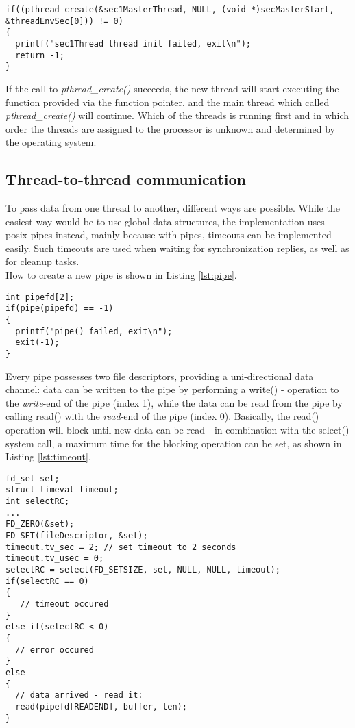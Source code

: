 \begin{lstlisting}[style=cStyle,caption={Creating a new thread},label=lst:pthread_create]
if((pthread_create(&sec1MasterThread, NULL, (void *)secMasterStart, &threadEnvSec[0])) != 0)
{
  printf("sec1Thread thread init failed, exit\n");
  return -1;
}
\end{lstlisting}
If the call to \textit{pthread\_create()} succeeds, the new thread will start executing the function provided via the function pointer, and the main thread which called 
\textit{pthread\_create()} will continue. Which of the threads is running first and in which order the threads are assigned to the processor is unknown and determined by the operating
system.

\subsection{Thread-to-thread communication}
To pass data from one thread to another, different ways are possible. While the easiest way would be to use global data structures, the implementation uses 
\gls{posix}-pipes instead, mainly because with pipes, timeouts can be implemented easily. Such timeouts are used when waiting for synchronization replies, as well as for 
cleanup tasks.
\\
How to create a new pipe is shown in Listing \ref{lst:pipe}.
\begin{lstlisting}[style=cStyle, caption={Creating a pipe},label=lst:pipe]
int pipefd[2];
if(pipe(pipefd) == -1)
{
  printf("pipe() failed, exit\n");
  exit(-1);
}
\end{lstlisting}
Every pipe possesses two file descriptors, providing a uni-directional data channel: data can be written to the pipe by performing a write() - operation to the \textit{write}-end of the
pipe (index 1), while the data can be read from the pipe by calling read() with the \textit{read}-end of the pipe (index 0). Basically, the read() operation will block until new data can be read - in 
combination with the select() system call, a maximum time for the blocking operation can be set, as shown in Listing \ref{lst:timeout}.
\begin{lstlisting}[style=cStyle,caption={Blocking read with timeout},label=lst:timeout]
fd_set set;
struct timeval timeout;
int selectRC;
...
FD_ZERO(&set);
FD_SET(fileDescriptor, &set);
timeout.tv_sec = 2;	// set timeout to 2 seconds
timeout.tv_usec = 0;
selectRC = select(FD_SETSIZE, set, NULL, NULL, timeout);
if(selectRC == 0)
{
   // timeout occured
}
else if(selectRC < 0)
{
  // error occured
}
else
{
  // data arrived - read it:
  read(pipefd[READEND], buffer, len);
}
\end{lstlisting}
